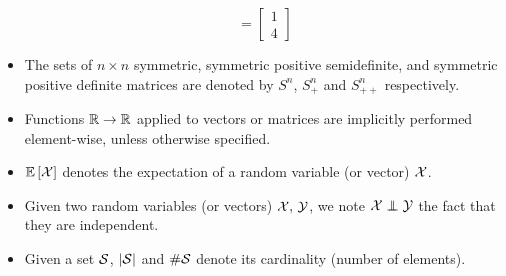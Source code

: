 \begin{itemize}
\begin{equation*}
        =
        \begin{bmatrix}
            1\\
            4
        \end{bmatrix}
    \end{equation*}
    \item The sets of $n \times n$ symmetric,
        symmetric positive semidefinite,
        and symmetric positive definite matrices
        are denoted by $S^n$, $S^n_+$ and $S^n_{++}$ respectively.
    \item Functions $\mathbb{R} \to \mathbb{R}$ applied to vectors or matrices are implicitly performed element-wise,
        unless otherwise specified.
    \item ${\mathbb E}\left[\mathcal{X}\right]$ denotes the expectation of a random variable (or vector) $\mathcal{X}$.
    \item Given two random variables (or vectors) $\mathcal{X},\, \mathcal{Y}$,
        we note $\cX \independent \cY$ the fact that they are independent.
    \item Given a set $\mathcal{S}$, $\left\lvert\mathcal{S}\right\rvert$ and $\#\mathcal{S}$ denote its cardinality (number of elements).
\end{itemize}

